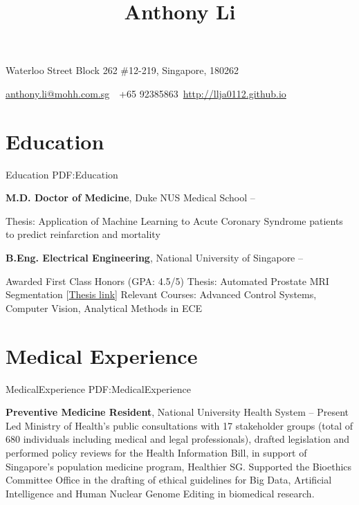 \documentclass[letterpaper,10pt,oneside]{article}
\newcommand{\CVAuthor}{Anthony Li}
\newcommand{\CVWebpage}{http://llja0112.github.io}
\begin{document}

\title{\CVAuthor}

\begin{subtitle}
{Waterloo Street Block 262 \#12-219, Singapore, 180262}
\par
\href{mailto:anthony.li@mohh.com.sg}
{anthony.li@mohh.com.sg}
\,\SubBulletSymbol\,
+65 92385863\,
\href{\CVWebpage}
{\CVWebpage}
\end{subtitle}

\begin{body}


\section
{Education}
{Education}
{PDF:Education}

{\textbf{M.D. Doctor of Medicine}, Duke NUS Medical School}
\hfill
{} -- 

\GapNoBreak
\BulletItem
Thesis: Application of Machine Learning to Acute Coronary Syndrome patients to predict 
\newline reinfarction and mortality

\BigGap
{\textbf{B.Eng. Electrical Engineering}, National University of Singapore}
\hfill
{} --

\GapNoBreak
\BulletItem
Awarded First Class Honors (GPA: 4.5/5)
\BulletItem
Thesis: Automated Prostate MRI Segmentation [\href{https://drive.google.com/open?id=0B1GfPKwMcZtpdWp0aUpxMnlKbU1oLVJFbjN3bGwwcXZlVVNJ}{Thesis link}]
\BulletItem
Relevant Courses: Advanced Control Systems, Computer Vision, Analytical Methods in ECE

\section
{Medical Experience}
{MedicalExperience}
{PDF:MedicalExperience}

{\textbf{Preventive Medicine Resident}, National University Health System}
\hfill
{} --
Present
\BulletItem
Led Ministry of Health's public consultations with 17 stakeholder groups (total of 680 individuals including medical and legal professionals), drafted legislation and performed policy reviews for the Health Information Bill, in support of Singapore's population medicine program, Healthier SG.
\BulletItem
Supported the Bioethics Committee Office in the drafting of ethical guidelines for Big Data, Artificial Intelligence and Human Nuclear Genome Editing in biomedical research.


\end{body}
\end{document}
